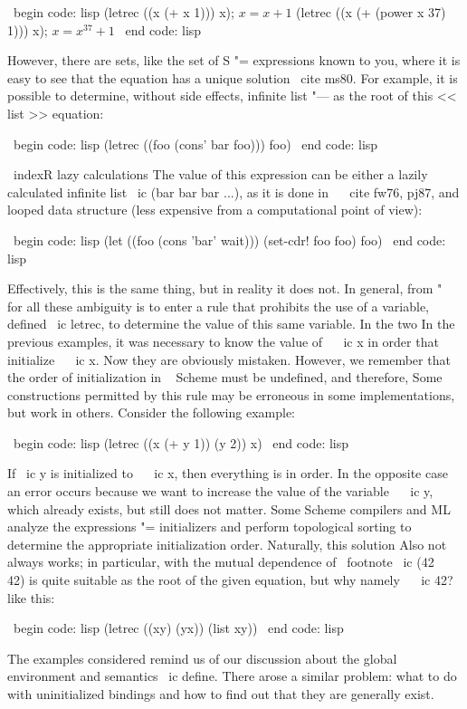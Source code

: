 {\ begin {code: lisp}
(letrec ((x (+ x 1))) x); $ x = x + 1 $
(letrec ((x (+ (power x 37) 1))) x); $ x = x ^ {37} + 1 $
\ end {code: lisp}

However, there are sets, like the set of S "= expressions known to you, where
it is easy to see that the equation has a unique solution
\ cite {ms80}. For example, it is possible to determine, without side effects,
infinite list "--- as the root of this << list >> equation:

\ begin {code: lisp}
(letrec ((foo (cons' bar foo))) foo)
\ end {code: lisp}

\ indexR {lazy calculations}
The value of this expression can be either a lazily calculated infinite
list \ ic {(bar bar bar ...)}, as it is done in ~ \ cite {fw76, pj87}, and
looped data structure (less expensive from a computational point of view):

\ begin {code: lisp}
(let ((foo (cons 'bar' wait)))
  (set-cdr! foo foo)
  foo)
\ end {code: lisp}

Effectively, this is the same thing, but in reality it does not. In general, from "~ for all these
ambiguity is to enter a rule that prohibits the use of a variable,
defined \ ic {letrec}, to determine the value of this same variable. In the two
In the previous examples, it was necessary to know the value of ~ \ ic {x} in order that
initialize ~ \ ic {x}. Now they are obviously mistaken. However, we
remember that the order of initialization in ~ Scheme must be undefined, and therefore,
Some constructions permitted by this rule may be erroneous
in some implementations, but work in others. Consider the following example:

\ begin {code: lisp}
(letrec ((x (+ y 1))
         (y 2))
  x)
\ end {code: lisp}

If \ ic {y} is initialized to ~ \ ic {x}, then everything is in order. In the opposite case
an error occurs because we want to increase the value of the variable ~ \ ic {y},
which already exists, but still does not matter. Some Scheme compilers
and ML analyze the expressions "= initializers and perform topological sorting
to determine the appropriate initialization order. Naturally, this solution
Also not ~ always works; in particular, with the mutual dependence of \ footnote {
\ ic {(42 ~ 42)} is quite suitable as the root of the given equation, but why
namely ~ \ ic {42}?} like this:

\ begin {code: lisp}
(letrec ((xy) (yx)) (list xy))
\ end {code: lisp}

The examples considered remind us of our discussion about the global environment
and semantics \ ic {define}. There arose a similar problem: what to do
with uninitialized bindings and how to find out that they are generally
exist.


}
